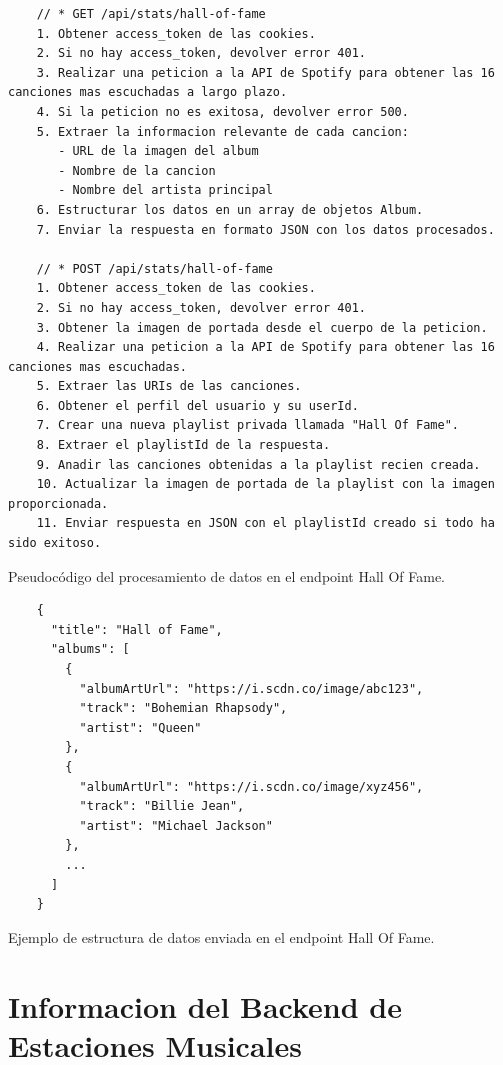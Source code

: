 \begin{ifalgorithm}[H]
  \begin{lstlisting}
    // * GET /api/stats/hall-of-fame
    1. Obtener access_token de las cookies.
    2. Si no hay access_token, devolver error 401.
    3. Realizar una peticion a la API de Spotify para obtener las 16 canciones mas escuchadas a largo plazo.
    4. Si la peticion no es exitosa, devolver error 500.
    5. Extraer la informacion relevante de cada cancion:
       - URL de la imagen del album
       - Nombre de la cancion
       - Nombre del artista principal
    6. Estructurar los datos en un array de objetos Album.
    7. Enviar la respuesta en formato JSON con los datos procesados.

    // * POST /api/stats/hall-of-fame
    1. Obtener access_token de las cookies.
    2. Si no hay access_token, devolver error 401.
    3. Obtener la imagen de portada desde el cuerpo de la peticion.
    4. Realizar una peticion a la API de Spotify para obtener las 16 canciones mas escuchadas.
    5. Extraer las URIs de las canciones.
    6. Obtener el perfil del usuario y su userId.
    7. Crear una nueva playlist privada llamada "Hall Of Fame".
    8. Extraer el playlistId de la respuesta.
    9. Anadir las canciones obtenidas a la playlist recien creada.
    10. Actualizar la imagen de portada de la playlist con la imagen proporcionada.
    11. Enviar respuesta en JSON con el playlistId creado si todo ha sido exitoso.
    \end{lstlisting}
  \caption{Pseudocódigo del procesamiento de datos en el endpoint Hall Of Fame.}
  \label{alg:hall_of_fame}
\end{ifalgorithm}

\begin{ifalgorithm}[H]
  \begin{lstlisting}
    {
      "title": "Hall of Fame",
      "albums": [
        {
          "albumArtUrl": "https://i.scdn.co/image/abc123",
          "track": "Bohemian Rhapsody",
          "artist": "Queen"
        },
        {
          "albumArtUrl": "https://i.scdn.co/image/xyz456",
          "track": "Billie Jean",
          "artist": "Michael Jackson"
        },
        ...
      ]
    }
    \end{lstlisting}
  \caption{Ejemplo de estructura de datos enviada en el endpoint Hall Of Fame.}
  \label{alg:hall_of_fame_response}
\end{ifalgorithm}

\section{Informacion del Backend de Estaciones Musicales} \label{sec:backend_estaciones_musicales}

